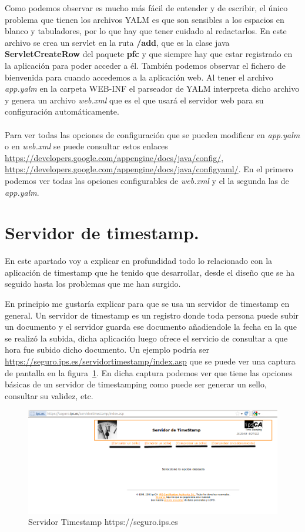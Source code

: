 Como podemos observar es mucho más fácil de entender y de escribir, el único problema que tienen los archivos YALM es que son sensibles a los espacios en blanco y tabuladores, por lo que hay que tener cuidado al redactarlos. En este archivo se crea un servlet en la ruta \textbf{/add}, que es la clase java \textbf{ServletCreateRow} del paquete \textbf{pfc} y que siempre hay que estar registrado en la aplicación para poder acceder a él. También podemos observar el fichero de bienvenida para cuando accedemos a la aplicación web. 
Al tener el archivo \textit{app.yalm} en la carpeta WEB-INF el parseador de YALM interpreta dicho archivo y genera un archivo \textit{web.xml} que es el que usará el servidor web para su configuración automáticamente.
\\
\\
Para ver todas las opciones de configuración que se pueden modificar en \textit{app.yalm} o en \textit{web.xml} se puede consultar estos enlaces \url{https://developers.google.com/appengine/docs/java/config/}, \url{https://developers.google.com/appengine/docs/java/configyaml/}. En el primero podemos ver todas las opciones configurables de \textit{web.xml} y el la segunda las de \textit{app.yalm}.

\section{Servidor de timestamp.\label{ref_server_timestamp_google_app_engine}}
En este apartado voy a explicar en profundidad todo lo relacionado con la aplicación de timestamp que he tenido que desarrollar, desde el diseño que se ha seguido hasta los problemas que me han surgido.

En principio me gustaría explicar para que se usa un servidor de timestamp en general. Un servidor de timestamp es un registro donde toda persona puede subir un documento y el servidor guarda ese documento añadiendole la fecha en la que se realizó la subida, dicha aplicación luego ofrece el servicio de consultar a que hora fue subido dicho documento. Un ejemplo podría ser \url{https://seguro.ips.es/servidortimestamp/index.asp} que se puede ver una captura de pantalla en la figura~\ref{fig:server_ips_timestamp}. En dicha captura podemos ver que tiene las opciones básicas de un servidor de timestamping como puede ser generar un sello, consultar su validez, etc. 

\begin{figure}[hbt]
  \centering
    \includegraphics[scale=0.5]{./GoogleAppEngine/imagenes/server_ips_timestamp.png}
  \caption{Servidor Timestamp https://seguro.ips.es}
  \label{fig:server_ips_timestamp}
\end{figure}

